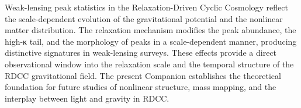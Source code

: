 \documentclass[11pt,a4paper]{article}
\begin{document}
Weak-lensing peak statistics in the Relaxation-Driven Cyclic Cosmology reflect the 
scale-dependent evolution of the gravitational potential and the nonlinear matter 
distribution. The relaxation mechanism modifies the peak abundance, the high-κ 
tail, and the morphology of peaks in a scale-dependent manner, producing 
distinctive signatures in weak-lensing surveys. These effects provide a direct 
observational window into the relaxation scale and the temporal structure of the 
RDCC gravitational field. The present Companion establishes the theoretical 
foundation for future studies of nonlinear structure, mass mapping, and the 
interplay between light and gravity in RDCC.


\nocite{*}

\end{document}
